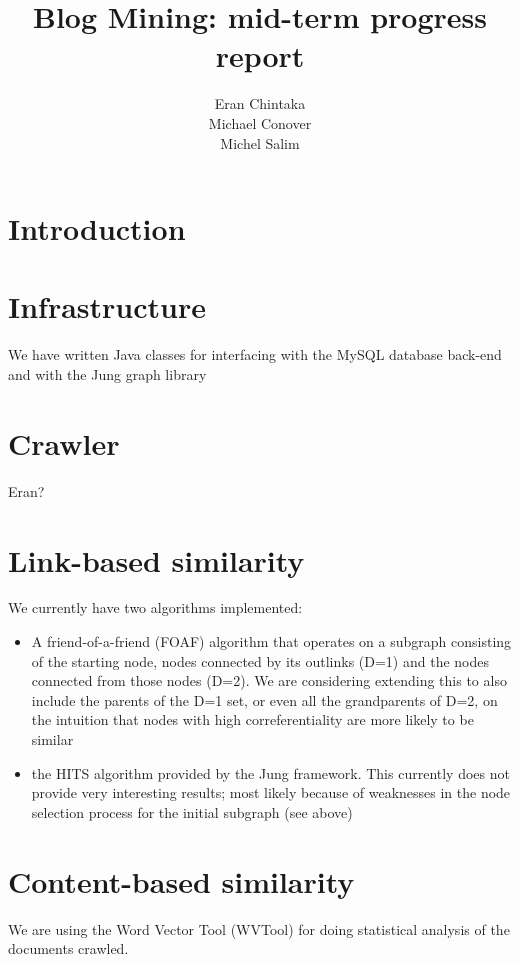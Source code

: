 \documentclass{article}
\author{Eran Chintaka\\
  Michael Conover\\
  Michel Salim}
\title{Blog Mining: mid-term progress report}
\begin{document}
\maketitle

\section{Introduction}

\section{Infrastructure}
We have written Java classes for interfacing with the MySQL database
back-end and with the Jung graph library

\section{Crawler}
Eran?

\section{Link-based similarity}
We currently have two algorithms implemented:
\begin{itemize}
\item A friend-of-a-friend (FOAF) algorithm that operates on a
  subgraph consisting of the starting node, nodes connected by its
  outlinks (D=1) and the nodes connected from those nodes (D=2). We
  are considering extending this to also include the parents of the
  D=1 set, or even all the grandparents of D=2, on the intuition that
  nodes with high correferentiality are more likely to be similar

\item the HITS algorithm provided by the Jung framework. This
  currently does not provide very interesting results; most likely
  because of weaknesses in the node selection process for the initial
  subgraph (see above)
\end{itemize}

\section{Content-based similarity}
We are using the Word Vector Tool (WVTool) for doing statistical
analysis of the documents crawled.
\end{document}

